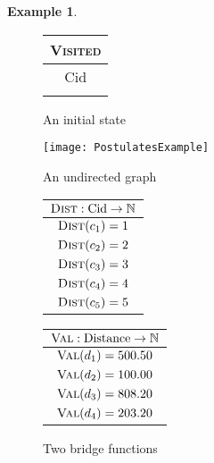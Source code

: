 \documentclass[preprint,11pt]{elsarticle}
\theoremstyle{definition}
\newtheorem{example}{Example}[section]
\theoremstyle{remark}
\begin{document}
\begin{example}
\begin{figure}[!ht]
\begin{minipage}{2.5cm}
\hspace*{1cm}
\end{minipage}\begin{minipage}{2cm}
{\normalsize\begin{tabular}{|c|}\hline
 \multicolumn{1}{|c|}{\textsc{Visited}}\\
  \hline
  Cid \\\hline
  \\
  \hline
\end{tabular}}
\end{minipage}
\begin{minipage}{2.5cm}
\end{minipage}\caption{An initial state}\label{fig:initialstate}
\end{figure}


\begin{figure}[!htbp]
\begin{minipage}{5cm}
\begin{center}
\texttt{[image: PostulatesExample]}
\end{center}\caption{An undirected graph}\label{fig:graph}
\end{minipage}
\begin{minipage}{7cm}
{\centering\begin{tabular}{|c|}\hline
 \multicolumn{1}{|c|}{$\textsc{Dist}:\mathrm{Cid} \rightarrow \mathbb{N}$}\\
  \hline
    $\textsc{Dist}(c_1)=1$ \\
  $\textsc{Dist}(c_2)=2$ \\
   $\textsc{Dist}(c_3)=3$ \\
   $\textsc{Dist}(c_4)=4$ \\
   $\textsc{Dist}(c_5)=5$ \\
\hline
 \end{tabular}}
{\centering \begin{tabular}{|c|}\hline
 \multicolumn{1}{|c|}{$\textsc{Val}:\mathrm{Distance} \rightarrow \mathbb{N}$}\\
  \hline
    $\textsc{Val}(d_1)=500.50$ \\
  $\textsc{Val}(d_2)=100.00$ \\
   $\textsc{Val}(d_3)=808.20$ \\
   $\textsc{Val}(d_4)=203.20$ \\
\hline
 \end{tabular}}
 \caption{Two bridge functions}
\end{minipage}


\end{figure}
\end{example}
\end{document}
